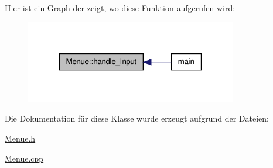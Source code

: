 Hier ist ein Graph der zeigt, wo diese Funktion aufgerufen wird\-:\nopagebreak
\begin{figure}[H]
\begin{center}
\leavevmode
\includegraphics[width=262pt]{class_menue_adab670791d2a103a26626b700698376d_icgraph}
\end{center}
\end{figure}




Die Dokumentation für diese Klasse wurde erzeugt aufgrund der Dateien\-:\begin{DoxyCompactItemize}
\item 
\hyperlink{_menue_8h}{Menue.\-h}\item 
\hyperlink{_menue_8cpp}{Menue.\-cpp}\end{DoxyCompactItemize}
